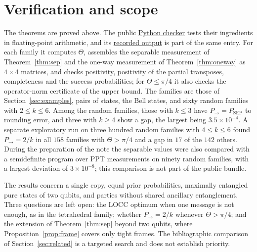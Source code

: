 \documentclass[11pt,a4paper]{article}
\theoremstyle{definition}
\theoremstyle{plain}
\newcommand{\Pow}{P_{\to}}
\newcommand{\Psep}{P_{\mathrm{SEP}}}
\begin{document}
\section{Verification and scope}\label{sec:verification}
The theorems are proved above. The public
\href{https://github.com/jpbruneton/open_quantum_problems/blob/main/research/entries/local-discrimination-entangled-qubits/checks/verify_discrimination.py}{Python checker}
tests their ingredients in floating-point arithmetic, and its
\href{https://github.com/jpbruneton/open_quantum_problems/blob/main/research/entries/local-discrimination-entangled-qubits/data/verification.json}{recorded output}
is part of the same entry. For each family it computes $\Theta$, assembles
the separable measurement of Theorem~\ref{thm:sep} and the one-way
measurement of Theorem~\ref{thm:oneway} as $4\times4$ matrices, and checks
positivity, positivity of the partial transposes, completeness and the
success probabilities; for $\Theta\le\pi/4$ it also checks the operator-norm
certificate of the upper bound. The families are those of
Section~\ref{sec:examples}, pairs of states, the Bell states, and sixty
random families with $2\le k\le6$. Among the random families, those with
$k\le3$ have $\Pow=\Psep$ to rounding error, and three with $k\ge4$ show a
gap, the largest being $3.5\times10^{-4}$. A separate exploratory run on three
hundred random families with $4\le k\le6$ found $\Pow=2/k$ in all $158$
families with $\Theta>\pi/4$ and a gap in $17$ of the $142$ others. During
the preparation of the note the separable values were also compared with a
semidefinite program over PPT measurements on ninety random families, with a
largest deviation of $3\times10^{-8}$; this comparison is not part of the
public bundle.

The results concern a single copy, equal prior probabilities, maximally
entangled pure states of two qubits, and parties without shared ancillary
entanglement. Three questions are left open: the LOCC optimum when one
message is not enough, as in the tetrahedral family; whether $\Pow=2/k$
whenever $\Theta>\pi/4$; and the extension of Theorem~\ref{thm:sep} beyond
two qubits, where Proposition~\ref{prop:frame} covers only tight frames. The
bibliographic comparison of Section~\ref{sec:related} is a targeted search
and does not establish priority.
\end{document}
